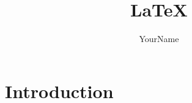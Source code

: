 \documentclass{article}
\title{\LaTeX}
\author{YourName}
\date{}
\begin{document}
\maketitle

\section{Introduction}
\end{document}
